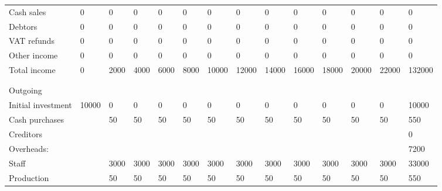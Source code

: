 \documentclass{article}
\begin{document}
\begin{landscape}
\begin{table}[H]
\begin{tabular}{llllllllllllll}
Cash sales         & 0       & 0       & 0       & 0       & 0       & 0       & 0       & 0       & 0       & 0        & 0        & 0        & 0         \\
Debtors            & 0       & 0       & 0       & 0       & 0       & 0       & 0       & 0       & 0       & 0        & 0        & 0        & 0         \\
VAT refunds        & 0       & 0       & 0       & 0       & 0       & 0       & 0       & 0       & 0       & 0        & 0        & 0        & 0         \\
Other income       & 0       & 0       & 0       & 0       & 0       & 0       & 0       & 0       & 0       & 0        & 0        & 0        & 0         \\
Total income       & 0       & 2000    & 4000    & 6000    & 8000    & 10000   & 12000   & 14000   & 16000   & 18000    & 20000    & 22000    & 132000    \\
                   &         &         &         &         &         &         &         &         &         &          &          &          &           \\
                   &         &         &         &         &         &         &         &         &         &          &          &          &           \\
Outgoing           &         &         &         &         &         &         &         &         &         &          &          &          &           \\
Initial investment & 10000   & 0       & 0       & 0       & 0       & 0       & 0       & 0       & 0       & 0        & 0        & 0        & 10000     \\
Cash purchases     &         & 50      & 50      & 50      & 50      & 50      & 50      & 50      & 50      & 50       & 50       & 50       & 550       \\
Creditors          &         &         &         &         &         &         &         &         &         &          &          &          & 0         \\
Overheads:         &         &         &         &         &         &         &         &         &         &          &          &          & 7200      \\
Staff              &         & 3000    & 3000    & 3000    & 3000    & 3000    & 3000    & 3000    & 3000    & 3000     & 3000     & 3000     & 33000     \\
Production         &         & 50      & 50      & 50      & 50      & 50      & 50      & 50      & 50      & 50       & 50       & 50       & 550       \\

\end{tabular}
\end{table}
\end{landscape}
\end{document}
